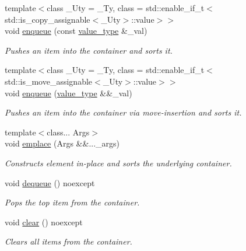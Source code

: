 \begin{DoxyCompactItemize}
{\footnotesize template$<$class \+\_\+\+Uty  = \+\_\+\+Ty, class  = std\+::enable\+\_\+if\+\_\+t$<$std\+::is\+\_\+copy\+\_\+assignable$<$\+\_\+\+Uty$>$\+::value$>$$>$ }\\void \hyperlink{classcrsc_1_1priority__queue_a9447e88a7c478c4b7a6b6b95f62cce6e}{enqueue} (const \hyperlink{classcrsc_1_1priority__queue_a2a7d77c9465b6c918f67021e6eb926d7}{value\+\_\+type} \&\+\_\+val)
\begin{DoxyCompactList}\small\item\em Pushes an item into the container and sorts it. \end{DoxyCompactList}\item 
{\footnotesize template$<$class \+\_\+\+Uty  = \+\_\+\+Ty, class  = std\+::enable\+\_\+if\+\_\+t$<$std\+::is\+\_\+move\+\_\+assignable$<$\+\_\+\+Uty$>$\+::value$>$$>$ }\\void \hyperlink{classcrsc_1_1priority__queue_a7104c88c185858be0b31e8219c77115e}{enqueue} (\hyperlink{classcrsc_1_1priority__queue_a2a7d77c9465b6c918f67021e6eb926d7}{value\+\_\+type} \&\&\+\_\+val)
\begin{DoxyCompactList}\small\item\em Pushes an item into the container via move-\/insertion and sorts it. \end{DoxyCompactList}\item 
{\footnotesize template$<$class... Args$>$ }\\void \hyperlink{classcrsc_1_1priority__queue_a6152229fef8983341ee6eda345a39cc7}{emplace} (Args \&\&...\+\_\+args)
\begin{DoxyCompactList}\small\item\em Constructs element in-\/place and sorts the underlying container. \end{DoxyCompactList}\item 
void \hyperlink{classcrsc_1_1priority__queue_a0b1fec17785494ed66d9f85c2079d1e7}{dequeue} () noexcept
\begin{DoxyCompactList}\small\item\em Pops the top item from the container. \end{DoxyCompactList}\item 
void \hyperlink{classcrsc_1_1priority__queue_a6d9196a9adcadc5f0c4e6e8e5559f4d7}{clear} () noexcept
\begin{DoxyCompactList}\small\item\em Clears all items from the container. \end{DoxyCompactList}\item 

\end{DoxyCompactItemize}
